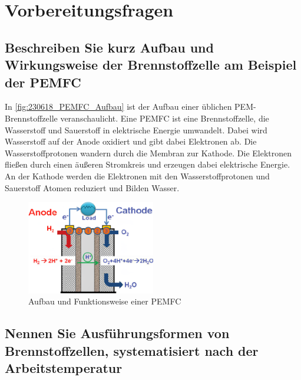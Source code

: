 \section{Vorbereitungsfragen}
\label{sec:Vorbereitungsfragen}

\subsection{Beschreiben Sie kurz Aufbau und Wirkungsweise der Brennstoffzelle am Beispiel der PEMFC}
In \autoref{fig:230618_PEMFC_Aufbau} ist der Aufbau einer üblichen PEM-Brennstoffzelle veranschaulicht. 
Eine PEMFC ist eine Brennstoffzelle, die Wasserstoff und Sauerstoff in elektrische Energie umwandelt.
Dabei wird Wasserstoff auf der Anode oxidiert und gibt dabei Elektronen ab.
Die Wasserstoffprotonen wandern durch die Membran zur Kathode.
Die Elektronen fließen durch einen äußeren Stromkreis und erzeugen dabei elektrische Energie.
An der Kathode werden die Elektronen mit den Wasserstoffprotonen und Sauerstoff Atomen reduziert und Bilden Wasser.

\begin{figure}[H]
    \centering
    \includegraphics[width=0.5\textwidth]{Abbildungen/PEMFC_Aufbau.png}
    \caption{Aufbau und Funktionsweise einer PEMFC \cite{PEMFC}}
    \label{fig:230618_PEMFC_Aufbau}
\end{figure}

\subsection{Nennen Sie Ausführungsformen von Brennstoffzellen, systematisiert nach der Arbeitstemperatur}

